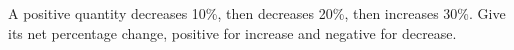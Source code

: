 A positive quantity decreases 10\%, then decreases 20\%, then increases 30\%. Give its net percentage change, positive for increase and negative for decrease.
